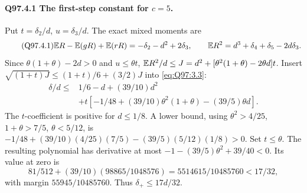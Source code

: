 \paragraph{Q97.4.1 The first-step constant for \(c=\allowbreak 5\).}
Put \(t=\allowbreak \delta_2/d\), \(u=\allowbreak \delta_3/d\). The exact mixed moments are
\begin{equation}\tag{Q97.4.1}\label{eq:Q97:4.1}
\mathbb E R-\mathbb E(gR)+\mathbb E(rR)=-\delta_2-d^2+2\delta_3,\qquad
\mathbb E R^2=d^3+\delta_4+\delta_5-2d\delta_3.
\end{equation}
Since \(\theta(1+\theta)-2d>\allowbreak 0\) and \(u\le\allowbreak \theta t\),
\(\mathbb E R^2/d\le\allowbreak  J=\allowbreak d^2+[\theta^2(1+\theta)-2\theta d]t\).
Insert \(\sqrt{(1+t)J}\le\allowbreak (1+t)/6+(3/2)J\) into
\eqref{eq:Q97:3.3}:
\begin{equation}\tag{Q97.4.2}\label{eq:Q97:4.2}
\begin{aligned}
\delta/d\le{}&1/6-d+(39/10)d^2\\
&+t[-1/48+(39/10)\theta^2(1+\theta)-(39/5)\theta d].
\end{aligned}
\end{equation}
The \(t\)-coefficient is positive for \(d\le\allowbreak 1/8\). A lower bound,
using \(\theta^2>\allowbreak 4/25\), \(1+\theta>\allowbreak 7/5\), \(\theta<\allowbreak 5/12\), is
\(-1/48+(39/10)(4/25)(7/5)-(39/5)(5/12)(1/8)>\allowbreak 0\).
Set \(t\le\allowbreak \theta\). The resulting polynomial has derivative at most
\(-1-(39/5)\theta^2+39/40<\allowbreak 0\). Its value at zero is
\begin{equation}\tag{Q97.4.3}\label{eq:Q97:4.3}
81/512+(39/10)(98865/1048576)=5514615/10485760<17/32,
\end{equation}
with margin \(55945/10485760\). Thus \(\delta_+\le\allowbreak 17d/32\).


